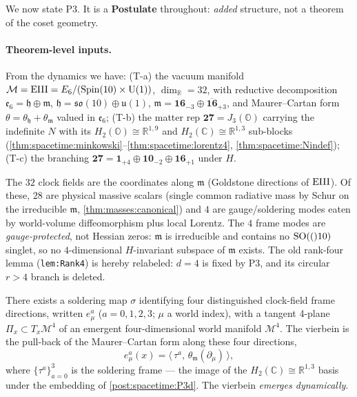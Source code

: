 We now state P3. It is a \textbf{Postulate} throughout: \emph{added} structure, not a
theorem of the coset geometry.

\paragraph{Theorem-level inputs.}
From the dynamics we have: (T-a) the vacuum manifold
$\mathcal M=\mathrm{EIII}=E_6/(\operatorname{Spin}(10)\times\mathrm{U}(1))$, $\dim_{\mathbb R}=32$, with reductive
decomposition $\mathfrak e_6=\mathfrak h\oplus\mathfrak m$,
$\mathfrak h=\mathfrak{so}(10)\oplus\mathfrak u(1)$,
$\mathfrak m=\mathbf{16}_{-3}\oplus\overline{\mathbf{16}}_{+3}$, and Maurer--Cartan
form $\theta=\theta_{\mathfrak h}+\theta_{\mathfrak m}$ valued in $\mathfrak e_6$;
(T-b) the matter rep $\mathbf{27}=J_3(\mathbb O)$ carrying the indefinite $N$ with its
$H_2(\mathbb O)\cong\mathbb R^{1,9}$ and $H_2(\mathbb C)\cong\mathbb R^{1,3}$ sub-blocks
(\autoref{thm:spacetime:minkowski}--\autoref{thm:spacetime:lorentz4},
\autoref{thm:spacetime:Nindef}); (T-c) the branching
$\mathbf{27}=\mathbf 1_{+4}\oplus\mathbf{10}_{-2}\oplus\mathbf{16}_{+1}$ under $H$.

The $32$ clock fields are the coordinates along $\mathfrak m$ (Goldstone directions of
$\mathrm{EIII}$). Of these, $28$ are physical massive scalars (single common radiative mass by
Schur on the irreducible $\mathfrak m$, \autoref{thm:masses:canonical}) and $4$ are
gauge/soldering modes eaten by world-volume diffeomorphism plus local Lorentz. The $4$
frame modes are \emph{gauge-protected}, not Hessian zeros: $\mathfrak m$ is
irreducible and contains no $\mathrm{SO}(()10)$ singlet, so no $4$-dimensional $H$-invariant
subspace of $\mathfrak m$ exists. The old rank-four lemma (\texttt{lem:Rank4}) is
hereby relabeled: $d=4$ is fixed by P3, and its circular $r>4$ branch is deleted.

\begin{postulate}\label{post:spacetime:P3a}
There exists a soldering map $\sigma$ identifying four distinguished clock-field frame
directions, written $e^a_\mu$ ($a=0,1,2,3$; $\mu$ a world index), with a tangent
4-plane $\Pi_x\subset T_x\mathcal M^4$ of an emergent four-dimensional world manifold
$\mathcal M^4$. The vierbein is the pull-back of the Maurer--Cartan form along these
four directions,
\begin{equation}\label{eq:spacetime:vierbein}
  e^a_\mu(x)=\bigl\langle\,\tau^a,\,\theta_{\mathfrak m}(\partial_\mu)\,\bigr\rangle,
\end{equation}
where $\{\tau^a\}_{a=0}^{3}$ is the soldering frame --- the image of the
$H_2(\mathbb C)\cong\mathbb R^{1,3}$ basis under the embedding of
\autoref{post:spacetime:P3d}. The vierbein \emph{emerges dynamically}.
\end{postulate}

